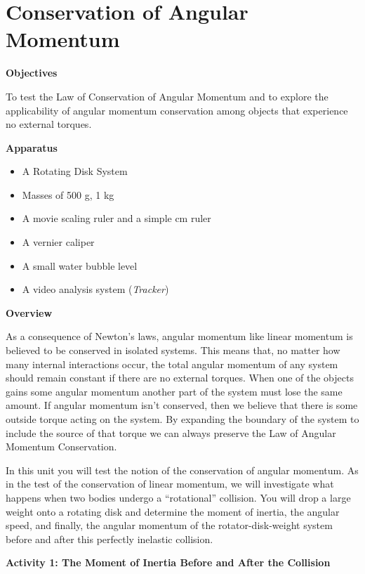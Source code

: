 
\section{Conservation of Angular Momentum}

\makelabheader %

\textbf{Objectives} 

To test the Law of Conservation of Angular Momentum and to explore the applicability
of angular momentum conservation among objects that experience no external torques. 

\textbf{Apparatus}

\begin{itemize}
\item A Rotating Disk System 
\item Masses of 500 g, 1 kg 
\item A movie scaling ruler and a simple cm ruler 
\item A vernier caliper
\item A small water bubble level
\item A video analysis system (\textit{Tracker})
\end{itemize}
\textbf{Overview }

As a consequence of Newton's laws, angular momentum like linear momentum is
believed to be conserved in isolated systems. This means that, no matter how
many internal interactions occur, the total angular momentum of any system should remain constant if there are no external torques. When one of the objects gains some angular momentum another part of the system must lose the same amount. If angular momentum isn't conserved, then we believe that there is some outside torque acting on the system. By expanding the boundary of the system to include the source of that torque we can always preserve the Law of Angular Momentum Conservation. 

In this unit you will test the notion of the conservation of angular momentum.
As in the test of the conservation of linear momentum, we will investigate what
happens when two bodies undergo a ``rotational'' collision.
You will drop a large weight onto a rotating disk and determine the moment of
inertia, the angular speed, and finally, the angular momentum of the rotator-disk-weight
system before and after this perfectly inelastic collision.

\textbf{Activity 1: The Moment of Inertia Before and After the Collision}

